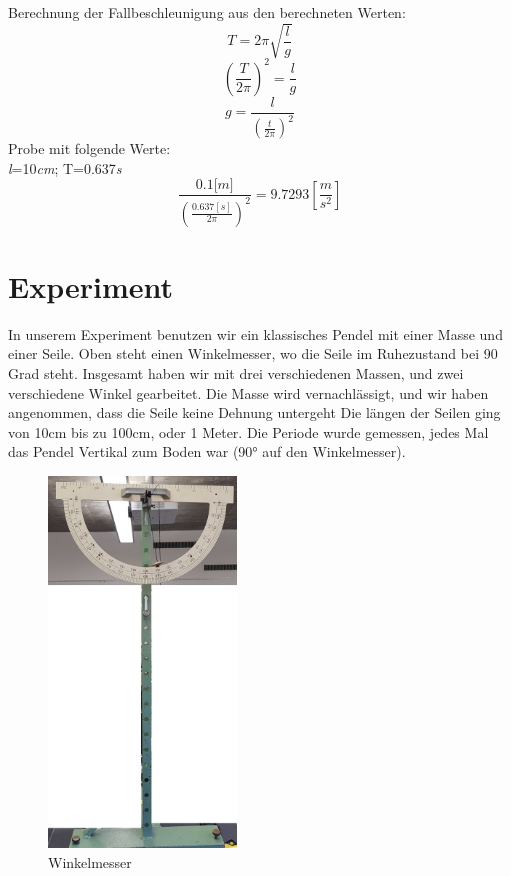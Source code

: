 \documentclass[12pt, a4paper, twoside]{article}
\begin{document}
        Berechnung der Fallbeschleunigung aus den berechneten Werten:
        \[T=2\pi\sqrt{\frac{l}{g}}\]     
        \[(\frac{T}{2\pi})^2=\frac{l}{g}\]
        \[g=\frac{l}{(\frac{t}{2\pi})^2}\]
        Probe mit folgende Werte:\\
        \textit{l}=10\textit{cm}; T=0.637\textit{s}
        \[\frac{0.1\textit{[m]}}{(\frac{0.637[s]}{2\pi})^2}=9.7293 [\frac{m}{s^2}]\]
        \pagebreak
        \section{Experiment}
        In unserem Experiment benutzen wir ein klassisches Pendel mit einer Masse und einer Seile. Oben steht einen Winkelmesser, wo die Seile im Ruhezustand bei 90 Grad steht. 
Insgesamt haben wir mit drei verschiedenen Massen, und zwei verschiedene Winkel gearbeitet. Die Masse wird vernachlässigt, und wir haben angenommen, dass die Seile keine Dehnung untergeht
Die längen der Seilen ging von 10cm bis zu 100cm, oder 1 Meter. 
Die Periode wurde gemessen, jedes Mal das Pendel Vertikal zum Boden war (90° auf den Winkelmesser). 
        \begin{figure}[h!]
            \centering
                \includegraphics[scale=0.25, width=5cm]{Winkelmesser.png}
                \caption{Winkelmesser}
                \label{fig:figure2}
        \end{figure}
\end{document}
